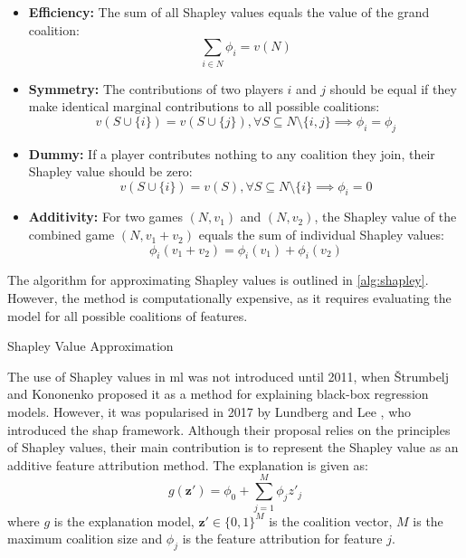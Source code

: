 \begin{itemize}
    \item \textbf{Efficiency:} The sum of all Shapley values equals the value of the grand coalition:
    \[
        \sum_{i \in N} \phi_i = v(N)
    \]
    \item \textbf{Symmetry:} The contributions of two players $i$ and $j$ should be equal if they make identical marginal contributions to all possible coalitions:
    \[
        v(S \cup \{i\}) = v(S \cup \{j\}), \forall S \subseteq N \setminus \{i, j\} \implies \phi_i = \phi_j
    \]
    \item \textbf{Dummy:} If a player contributes nothing to any coalition they join, their Shapley value should be zero:
    \[
        v(S \cup \{i\}) = v(S), \forall S \subseteq N \setminus \{i\} \implies \phi_i = 0
    \]
    \item \textbf{Additivity:} For two games $(N,v_1)$ and $(N,v_2)$, the Shapley value of the combined game $(N,v_1+v_2)$ equals the sum of individual Shapley values:
    \[
        \phi_i(v_1 + v_2) = \phi_i(v_1) + \phi_i(v_2)
    \]
\end{itemize}

The algorithm for approximating Shapley values is outlined in \ref{alg:shapley}. However, the method is computationally expensive, as it requires evaluating the model for all possible coalitions of features.

\begin{algorithm}
\caption{Shapley Value Approximation}

\label{alg:shapley}
\end{algorithm}

The use of Shapley values in \acrshort{ml} was not introduced until 2011, when Štrumbelj and Kononenko \cite{Strumbelj2011} proposed it as a method for explaining black-box regression models. However, it was popularised in 2017 by Lundberg and Lee \cite{Lundberg2017}, who introduced the \acrshort{shap} framework. Although their proposal relies on the principles of Shapley values, their main contribution is to represent the Shapley value as an additive feature attribution method. The explanation is given as:
\begin{equation}
    g(\mathbf{z}') = \phi_0 + \sum_{j=1}^{M} \phi_j z'_j
\end{equation}
where $g$ is the explanation model, $\mathbf{z}' \in \{0,1\}^M$ is the coalition vector, $M$ is the maximum coalition size and $\phi_j$ is the feature attribution for feature $j$.

